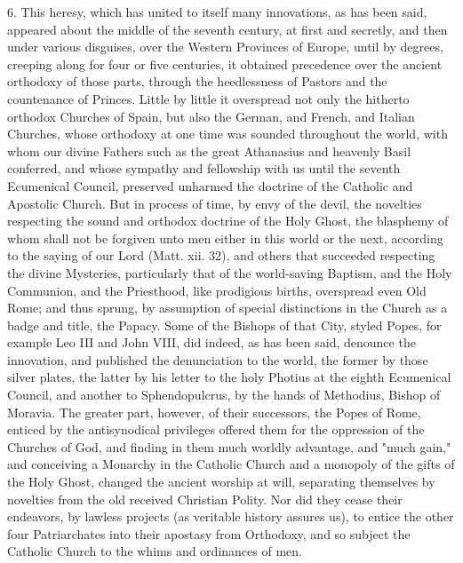 6. This heresy, which has united to itself many innovations, as has been
said, appeared about the middle of the seventh century, at first and
secretly, and then under various disguises, over the Western Provinces
of Europe, until by degrees, creeping along for four or five centuries,
it obtained precedence over the ancient orthodoxy of those parts,
through the heedlessness of Pastors and the countenance of Princes.
Little by little it overspread not only the hitherto orthodox Churches
of Spain, but also the German, and French, and Italian Churches, whose
orthodoxy at one time was sounded throughout the world, with whom our
divine Fathers such as the great Athanasius and heavenly Basil
conferred, and whose sympathy and fellowship with us until the seventh
Ecumenical Council, preserved unharmed the doctrine of the Catholic and
Apostolic Church. But in process of time, by envy of the devil, the
novelties respecting the sound and orthodox doctrine of the Holy Ghost,
the blasphemy of whom shall not be forgiven unto men either in this
world or the next, according to the saying of our Lord (Matt. xii. 32),
and others that succeeded respecting the divine Mysteries, particularly
that of the world-saving Baptism, and the Holy Communion, and the
Priesthood, like prodigious births, overspread even Old Rome; and thus
sprung, by assumption of special distinctions in the Church as a badge
and title, the Papacy. Some of the Bishops of that City, styled Popes,
for example Leo III and John VIII, did indeed, as has been said,
denounce the innovation, and published the denunciation to the world,
the former by those silver plates, the latter by his letter to the holy
Photius at the eighth Ecumenical Council, and another to Sphendopulcrus,
by the hands of Methodius, Bishop of Moravia. The greater part, however,
of their successors, the Popes of Rome, enticed by the antisynodical
privileges offered them for the oppression of the Churches of God, and
finding in them much worldly advantage, and "much gain," and conceiving
a Monarchy in the Catholic Church and a monopoly of the gifts of the
Holy Ghost, changed the ancient worship at will, separating themselves
by novelties from the old received Christian Polity. Nor did they cease
their endeavors, by lawless projects (as veritable history assures us),
to entice the other four Patriarchates into their apostasy from
Orthodoxy, and so subject the Catholic Church to the whims and
ordinances of men.

